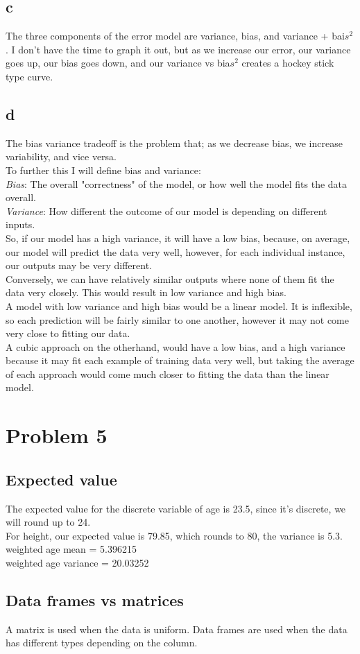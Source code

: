 \documentclass{article}
\begin{document}
\subsection*{c}
The three components of the error model are variance, bias, and variance + bai$s^2$. I don't have the time to graph it out, but as we increase our error, our variance goes up, our bias goes down, and our variance vs bia$s^2$ creates a hockey stick type curve.\\
\subsection*{d}
The bias variance tradeoff is the problem that; as we decrease bias, we increase variability, and vice versa.\\
To further this I will define bias and variance:\\
\textit{Bias}: The overall "correctness" of the model, or how well the model fits the data overall.\\
\textit{Variance}: How different the outcome of our model is depending on different inputs.\\
So, if our model has a high variance, it will have a low bias, because, on average, our model will predict the data very well, however, for each individual instance, our outputs may be very different.\\
Conversely, we can have relatively similar outputs where none of them fit the data very closely. This would result in low variance and high bias.\\
A model with low variance and high bias would be a linear model. It is inflexible, so each prediction will be fairly similar to one another, however it may not come very close to fitting our data.\\
A cubic approach on the otherhand, would have a low bias, and a high variance because it may fit each example of training data very well, but taking the average of each approach would come much closer to fitting the data than the linear model.\\

\section*{Problem 5}
\subsection*{Expected value}
The expected value for the discrete variable of age is 23.5, since it's discrete, we will round up to 24.\\
For height, our expected value is 79.85, which rounds to 80, the variance is 5.3.\\
weighted age mean = 5.396215 \\
weighted age variance = 20.03252\\
\subsection*{Data frames vs matrices}
A matrix is used when the data is uniform. Data frames are used when the data has different types depending on the column.\\
\end{document}
